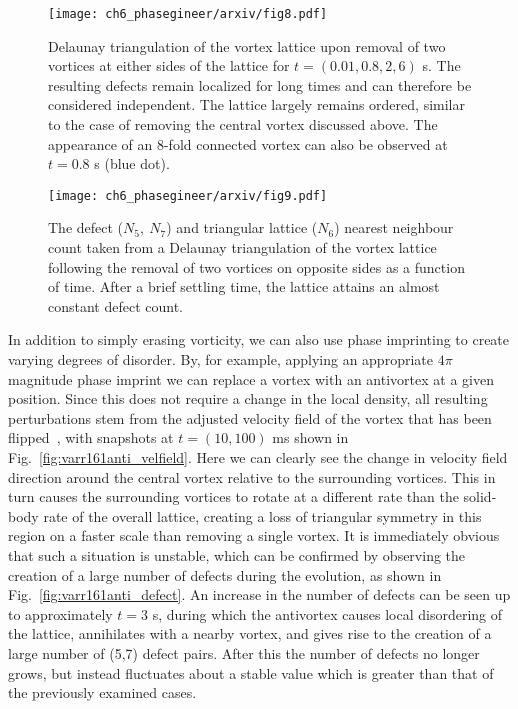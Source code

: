 \begin{figure}\centering
    \texttt{[image: ch6\_phasegineer/arxiv/fig8.pdf]}
    \caption{Delaunay triangulation of the vortex lattice upon removal of two vortices at either sides of the lattice for $t=(0.01,0.8,2,6)$ s. The resulting defects remain localized for long times and can therefore be considered independent. The lattice largely remains ordered, similar to the case of removing the central vortex discussed above. The appearance of an 8-fold connected vortex can also be observed at $t=0.8$ s (blue dot).}\label{fig:traj_2vtx_edge}
\end{figure}

\begin{figure}\centering
    \texttt{[image: ch6\_phasegineer/arxiv/fig9.pdf]}
    \caption{The defect ($N_5,~N_7$) and triangular lattice ($N_6$) nearest neighbour count taken from a Delaunay triangulation of the vortex lattice following the removal of two vortices on opposite sides as a function of time. After a brief settling time, the lattice attains an almost constant defect count.}
    \label{fig:vtx_rem2_edge}
\end{figure}


In addition to simply erasing vorticity, we can also use phase imprinting to create varying degrees of disorder. By, for example, applying an appropriate $4\pi$ magnitude phase imprint we can replace a vortex with an antivortex at a given position. Since this does not require a change in the local density, all resulting perturbations stem from the adjusted velocity field of the vortex that has been flipped~\cite{VTX:Madarassy_gfd_2009}, with snapshots at $t=(10,100)$ ms shown in Fig.~\ref{fig:varr161anti_velfield}. Here we can clearly see the change in velocity field direction around the central vortex relative to the surrounding vortices. This in turn causes the surrounding vortices to rotate at a different rate than the solid-body rate of the overall lattice, creating a loss of triangular symmetry in this region on a faster scale than removing a single vortex. It is immediately obvious that such a situation is unstable, which can be confirmed by observing the creation of a large number of defects during the evolution, as shown in Fig.~\ref{fig:varr161anti_defect}. An increase in the number of defects can be seen up to approximately $t=3$ s, during which the antivortex causes local disordering of the lattice, annihilates with a nearby vortex, and gives rise to the creation of a large number of (5,7) defect pairs. After this the number of defects no longer grows, but instead fluctuates about a stable value which is greater than that of the previously examined cases.

